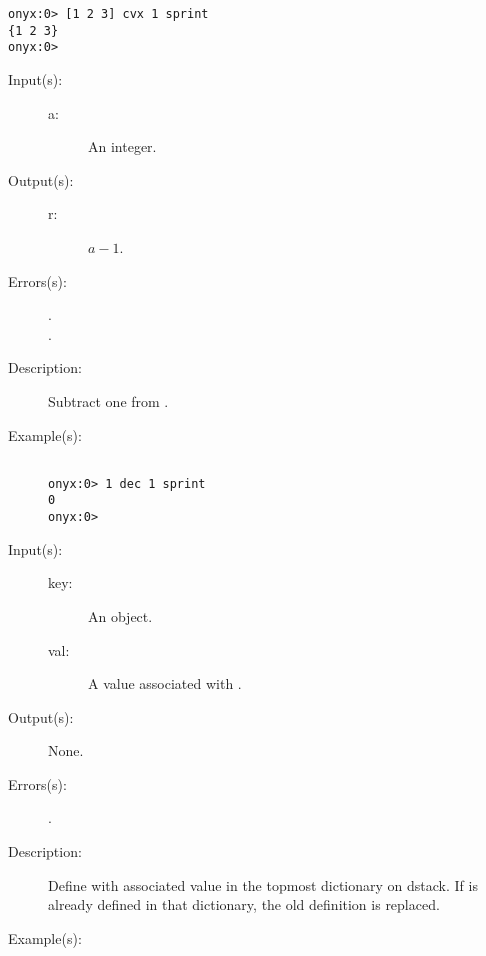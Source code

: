 \begin{description}
\begin{description}
\begin{verbatim}
onyx:0> [1 2 3] cvx 1 sprint
{1 2 3}
onyx:0>
		\end{verbatim}
	\end{description}
\label{systemdict:dec}
\item[{\onyxop{a}{dec}{r}}: ]
	\begin{description}\item[]
	\item[Input(s): ]
		\begin{description}\item[]
		\item[a: ]
			An integer.
		\end{description}
	\item[Output(s): ]
		\begin{description}\item[]
		\item[r: ]
			$a - 1$.
		\end{description}
	\item[Errors(s): ]
		\begin{description}\item[]
		\item[.]
		\item[.]
		\end{description}
	\item[Description: ]
		Subtract one from .
	\item[Example(s): ]\begin{verbatim}

onyx:0> 1 dec 1 sprint
0
onyx:0>
		\end{verbatim}
	\end{description}
\label{systemdict:def}
\item[{\onyxop{key val}{def}{--}}: ]
	\begin{description}\item[]
	\item[Input(s): ]
		\begin{description}\item[]
		\item[key: ]
			An object.
		\item[val: ]
			A value associated with .
		\end{description}
	\item[Output(s): ] None.
	\item[Errors(s): ]
		\begin{description}\item[]
		\item[.]
		\end{description}
	\item[Description: ]
		Define  with associated value  in the
		topmost dictionary on dstack.  If  is already defined
		in that dictionary, the old definition is replaced.
	\item[Example(s): ]\begin{verbatim}


\end{verbatim}
\end{description}
\end{description}
